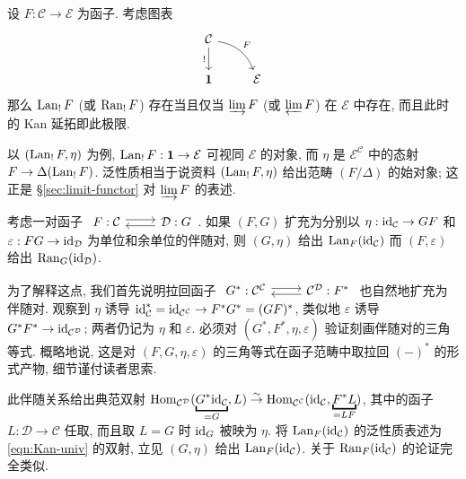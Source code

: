 \begin{example}\label{eg:limit-as-Kan}
	设 $F: \mathcal{C} \to \mathcal{E}$ 为函子. 考虑图表
	\[\begin{tikzcd}
		\mathcal{C} \arrow[d, "!"'] \arrow[rd, bend left, "F"] & \\
		\mathbf{1} & \mathcal{E}
	\end{tikzcd}\]
	那么 $\operatorname{Lan}_! F$ (或 $\operatorname{Ran}_! F$) 存在当且仅当 $\varinjlim F$ (或 $\varprojlim F$) 在 $\mathcal{E}$ 中存在, 而且此时的 Kan 延拓即此极限.

	以 $(\operatorname{Lan}_! F, \eta)$ 为例, $\operatorname{Lan}_! F: \mathbf{1} \to \mathcal{E}$ 可视同 $\mathcal{E}$ 的对象, 而 $\eta$ 是 $\mathcal{E}^{\mathcal{C}}$ 中的态射 $F \to \Delta(\operatorname{Lan}_! F)$. 泛性质相当于说资料 $(\operatorname{Lan}_! F, \eta)$ 给出范畴 $(F/\Delta)$ 的始对象; 这正是 \S\ref{sec:limit-functor} 对 $\varinjlim F$ 的表述.
\end{example}

\begin{example}
	考虑一对函子
	$\begin{tikzcd} F: \mathcal{C} \arrow[r, shift left] & \mathcal{D}: G \arrow[l, shift left] \end{tikzcd}$.
	如果 $(F, G)$ 扩充为分别以 $\eta: \mathrm{id}_{\mathcal{C}} \to GF$ 和 $\varepsilon: FG \to \mathrm{id}_{\mathcal{D}}$ 为单位和余单位的伴随对, 则 $(G, \eta)$ 给出 $\operatorname{Lan}_F (\mathrm{id}_{\mathcal{C}})$ 而 $(F, \varepsilon)$ 给出 $\operatorname{Ran}_G (\mathrm{id}_{\mathcal{D}})$.
	
	为了解释这点, 我们首先说明拉回函子
	$\begin{tikzcd} G^*: \mathcal{C}^{\mathcal{C}} \arrow[r, shift left] & \mathcal{C}^{\mathcal{D}}: F^* \arrow[l, shift left] \end{tikzcd}$
	也自然地扩充为伴随对. 观察到 $\eta$ 诱导 $\mathrm{id}_{\mathcal{C}}^* = \mathrm{id}_{\mathcal{C}^{\mathcal{C}}} \to F^* G^* = (GF)^*$, 类似地 $\varepsilon$ 诱导 $G^* F^* \to \mathrm{id}_{\mathcal{C}^{\mathcal{D}}}$; 两者仍记为 $\eta$ 和 $\varepsilon$. 必须对 $(G^*, F^*, \eta, \varepsilon)$ 验证刻画伴随对的三角等式. 概略地说, 这是对 $(F, G, \eta, \varepsilon)$ 的三角等式在函子范畴中取拉回 $(-)^*$ 的形式产物, 细节谨付读者思索.

	此伴随关系给出典范双射 $\Hom_{\mathcal{C}^{\mathcal{D}}}(\underbracket{G^* \identity_{\mathcal{C}}}_{= G}, L) \rightiso \Hom_{\mathcal{C}^{\mathcal{C}}}(\identity_{\mathcal{C}} , \underbracket{F^* L}_{=LF})$, 其中的函子 $L: \mathcal{D} \to \mathcal{C}$ 任取, 而且取 $L = G$ 时 $\mathrm{id}_G$ 被映为 $\eta$. 将 $\operatorname{Lan}_F (\mathrm{id}_{\mathcal{C}})$ 的泛性质表述为 \eqref{eqn:Kan-univ} 的双射, 立见 $(G, \eta)$ 给出 $\operatorname{Lan}_F (\mathrm{id}_{\mathcal{C}})$. 关于 $\operatorname{Ran}_F (\mathrm{id}_{\mathcal{C}})$ 的论证完全类似.
\end{example}

